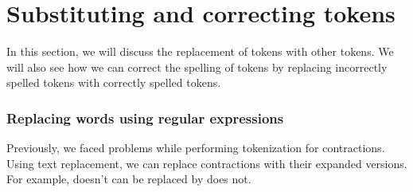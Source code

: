 \documentclass[11pt]{article}
\begin{document}
    \hypertarget{substituting-and-correcting-tokens}{%
\section{Substituting and correcting
tokens}\label{substituting-and-correcting-tokens}}

    In this section, we will discuss the replacement of tokens with other
tokens. We will also see how we can correct the spelling of tokens by
replacing incorrectly spelled tokens with correctly spelled tokens.

    \hypertarget{replacing-words-using-regular-expressions}{%
\subsubsection{Replacing words using regular
expressions}\label{replacing-words-using-regular-expressions}}

    Previously, we faced problems while performing tokenization for
contractions. Using text replacement, we can replace contractions with
their expanded versions. For example, doesn't can be replaced by does
not.
\end{document}
